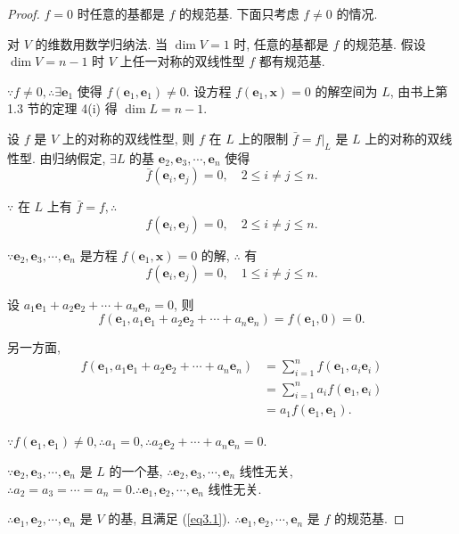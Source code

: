 \documentclass[color=black,device=normal,lang=cn,mode=geye]{elegantnote}
\begin{document}
\begin{proof}
    $f=0$ 时任意的基都是 $f$ 的规范基. 下面只考虑 $f\neq0$ 的情况.

    对 $V$ 的维数用数学归纳法. 当 $\dim V=1$ 时, 任意的基都是 $f$ 的规范基. 假设 $\dim V=n-1$ 时 $V$ 上任一对称的双线性型 $f$ 都有规范基.

    $\because f\neq0,\therefore\exists\boldsymbol{e}_1$ 使得 $f(\boldsymbol{e}_1,\boldsymbol{e}_1)\neq0$. 设方程 $f(\boldsymbol{e}_1,\boldsymbol{x})=0$ 的解空间为 $L$, 由书上第 1.3 节的定理 4(i) 得 $\dim L=n-1$.
    
    设 $f$ 是 $V$ 上的对称的双线性型, 则 $f$ 在 $L$ 上的限制 $\bar{f}=f|_L$ 是 $L$ 上的对称的双线性型. 由归纳假定, $\exists L$ 的基 $\boldsymbol{e}_2,\boldsymbol{e}_3,\cdots,\boldsymbol{e}_n$ 使得
    \[\bar{f}(\boldsymbol{e}_i,\boldsymbol{e}_j)=0,\quad2\leq i\neq j\leq n.\]

    $\because$ 在 $L$ 上有 $\bar{f}=f,\therefore$
    \[f(\boldsymbol{e}_i,\boldsymbol{e}_j)=0,\quad2\leq i\neq j\leq n.\]

    $\because\boldsymbol{e}_2,\boldsymbol{e}_3,\cdots,\boldsymbol{e}_n$ 是方程 $f(\boldsymbol{e}_1,\boldsymbol{x})=0$ 的解, $\therefore$ 有
    \begin{equation}\label{eq3.1}
        f(\boldsymbol{e}_i,\boldsymbol{e}_j)=0,\quad1\leq i\neq j\leq n.
    \end{equation}
    
    设 $a_1\boldsymbol{e}_1+a_2\boldsymbol{e}_2+\cdots+a_n\boldsymbol{e}_n=0$, 则
    \[f(\boldsymbol{e}_1,a_1\boldsymbol{e}_1+a_2\boldsymbol{e}_2+\cdots+a_n\boldsymbol{e}_n)=f(\boldsymbol{e}_1,0)=0.\]

    另一方面,
    \begin{align*}
        f(\boldsymbol{e}_1,a_1\boldsymbol{e}_1+a_2\boldsymbol{e}_2+\cdots+a_n\boldsymbol{e}_n) & =\sum\limits_{i=1}^nf(\boldsymbol{e}_1,a_i\boldsymbol{e}_i) \\
        & =\sum\limits_{i=1}^na_if(\boldsymbol{e}_1,\boldsymbol{e}_i) \\
        & =a_1f(\boldsymbol{e}_1,\boldsymbol{e}_1).
    \end{align*}

    $\because f(\boldsymbol{e}_1,\boldsymbol{e}_1)\neq0,\therefore a_1=0,\therefore a_2\boldsymbol{e}_2+\cdots+a_n\boldsymbol{e}_n=0$.

    $\because\boldsymbol{e}_2,\boldsymbol{e}_3,\cdots,\boldsymbol{e}_n$ 是 $L$ 的一个基, $\therefore\boldsymbol{e}_2,\boldsymbol{e}_3,\cdots,\boldsymbol{e}_n$ 线性无关, $\therefore a_2=a_3=\cdots=a_n=0.\therefore\boldsymbol{e}_1,\boldsymbol{e}_2,\cdots,\boldsymbol{e}_n$ 线性无关.

    $\therefore\boldsymbol{e}_1,\boldsymbol{e}_2,\cdots,\boldsymbol{e}_n$ 是 $V$ 的基, 且满足 (\ref{eq3.1}). $\therefore\boldsymbol{e}_1,\boldsymbol{e}_2,\cdots,\boldsymbol{e}_n$ 是 $f$ 的规范基.
\end{proof}
\end{document}
